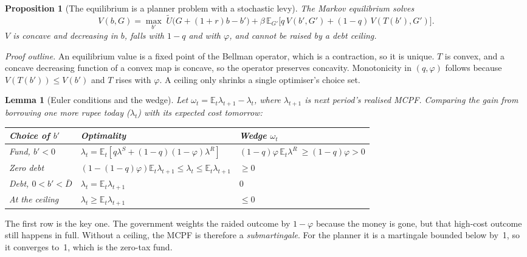 \documentclass[11pt]{article}
\newtheorem{proposition}{Proposition}
\newtheorem{lemma}{Lemma}
\newcommand{\E}{\mathbb{E}}
\begin{document}
\begin{proposition}[The equilibrium is a planner problem with a stochastic levy]\label{prop:planner}
The Markov equilibrium solves
\[
V(b,G)=\max_{b'}\;\tilde U\big(G+(1+r)b-b'\big)+\beta\,\E_{G'}\big[q\,V(b',G')+(1-q)\,V(T(b'),G')\big].
\]
$V$ is concave and decreasing in $b$, falls with $1-q$ and with $\varphi$, and cannot be raised by a debt ceiling.
\end{proposition}
\noindent\emph{Proof outline.} An equilibrium value is a fixed point of the Bellman operator, which is a contraction, so it is unique. $T$ is convex, and a concave decreasing function of a convex map is concave, so the operator preserves concavity. Monotonicity in $(q,\varphi)$ follows because $V(T(b'))\le V(b')$ and $T$ rises with $\varphi$. A ceiling only shrinks a single optimiser's choice set.

\begin{lemma}[Euler conditions and the wedge]\label{lem:wedge}
Let $\omega_t=\E_t\lambda_{t+1}-\lambda_t$, where $\lambda_{t+1}$ is next period's realised MCPF. Comparing the gain from borrowing one more rupee today ($\lambda_t$) with its expected cost tomorrow:
\begin{center}
\begin{tabular}{lll}
\toprule
Choice of $b'$ & Optimality & Wedge $\omega_t$\\
\midrule
Fund, $b'<0$ & $\lambda_t=\E_t[q\lambda^S+(1-q)(1-\varphi)\lambda^R]$ & $(1-q)\varphi\,\E_t\lambda^R\ \ge (1-q)\varphi>0$\\
Zero debt & $(1-(1-q)\varphi)\E_t\lambda_{t+1}\le\lambda_t\le\E_t\lambda_{t+1}$ & $\ge 0$\\
Debt, $0<b'<\bar D$ & $\lambda_t=\E_t\lambda_{t+1}$ & $0$\\
At the ceiling & $\lambda_t\ge\E_t\lambda_{t+1}$ & $\le 0$\\
\bottomrule
\end{tabular}
\end{center}
\end{lemma}
\noindent The first row is the key one. The government weights the raided outcome by $1-\varphi$ because the money is gone, but that high-cost outcome still happens in full. Without a ceiling, the MCPF is therefore a \emph{submartingale}. For the planner it is a martingale bounded below by~1, so it converges to~1, which is the zero-tax fund.
\end{document}
